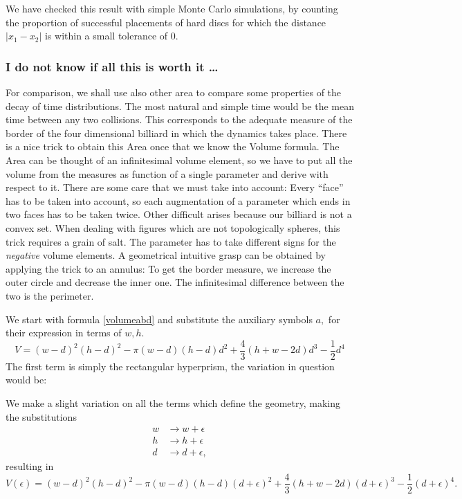 \documentclass[a4paper,10pt]{article}
\begin{document}
We have checked this result with simple Monte Carlo simulations, by counting the proportion of successful placements of hard discs for which the distance $|x_1 - x_2|$ is within a small tolerance of $0$.


\subsubsection{I do not know if all this is worth it \ldots}
For comparison, we shall use also other area to compare
some properties of the decay of time distributions. The most natural and simple
time would be the mean time between any two collisions. This corresponds
to the adequate measure of the border of the four dimensional
billiard in which the dynamics takes place. There is a nice trick
to obtain this Area once that we know the Volume formula. The Area
can be thought of an infinitesimal volume element, so we have to put
all the volume from the measures as function of a single parameter
and derive with respect to it. 
There are some care that we must take into account:
Every ``face'' has to be taken into account, so each augmentation of 
a parameter which ends in two faces has to be taken twice.
Other difficult arises because our
billiard is not a convex set. When dealing with figures
which are not topologically spheres, this trick requires
a grain of salt. The parameter has to take different
signs for the \emph{negative} volume elements. A geometrical
intuitive grasp can be obtained by applying the trick to an annulus:
To get the border measure, we increase the outer circle and
decrease the inner one. The infinitesimal difference between the two
is the perimeter. 


 We start with formula \ref{volumeabd}
and substitute the auxiliary symbols $a,$ for their expression in
terms of $w,h$.
\begin{equation}\label{volumehwd}
 V= (w-d)^2(h-d)^2-\pi(w-d)(h-d)d^2+\frac{4}{3}(h+w-2d)d^3-\frac{1}{2}d^4
\end{equation}
The first term is simply the rectangular hyperprism, the variation in question
would be:

We make a slight variation on all the terms which  define the geometry,
making the substitutions
\begin{align}
w & \rightarrow w+\epsilon \\
h & \rightarrow h+\epsilon \\
d & \rightarrow d+\epsilon ,
\end{align}
resulting in
\begin{equation}\label{volumeepsilon}
 V(\epsilon) = (w-d)^2(h-d)^2-\pi(w-d)(h-d)(d+\epsilon)^2+
\frac{4}{3}(h+w-2d)(d+\epsilon)^3-\frac{1}{2}(d+\epsilon)^4.
\end{equation}
\end{document}
